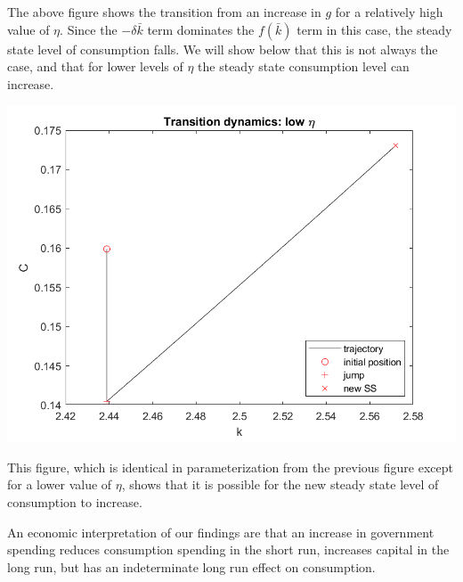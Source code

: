 \documentclass[11pt]{article} %
\begin{document}
The above figure shows the transition from an increase in $g$ for a relatively high value of $\eta$. Since the $-\delta \bar{k}$ term dominates the $f(\bar{k})$ term in this case, the steady state level of consumption falls. We will show below that this is not always the case, and that for lower levels of $\eta$ the steady state consumption level can increase.

\includegraphics{loweta}

This figure, which is identical in parameterization from the previous figure except for a lower value of $\eta$, shows that it is possible for the new steady state level of consumption to increase.

An economic interpretation of our findings are that an increase in government spending reduces consumption spending in the short run, increases capital in the long run, but has an indeterminate long run effect on consumption.
\end{document}
